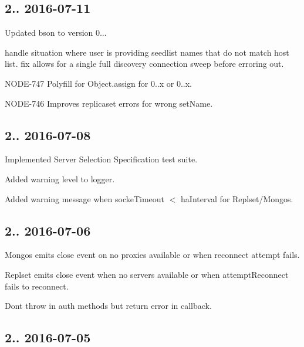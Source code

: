 \subsection*{2.. 2016-\/07-\/11 }


\begin{DoxyItemize}
\item Updated bson to version 0...
\item handle situation where user is providing seedlist names that do not match host list. fix allows for a single full discovery connection sweep before erroring out.
\item N\+O\+D\+E-\/747 Polyfill for Object.\+assign for 0..\+x or 0..\+x.
\item N\+O\+D\+E-\/746 Improves replicaset errors for wrong set\+Name.
\end{DoxyItemize}

\subsection*{2.. 2016-\/07-\/08 }


\begin{DoxyItemize}
\item Implemented Server Selection Specification test suite.
\item Added warning level to logger.
\item Added warning message when socke\+Timeout $<$ ha\+Interval for Replset/\+Mongos.
\end{DoxyItemize}

\subsection*{2.. 2016-\/07-\/06 }


\begin{DoxyItemize}
\item Mongos emits close event on no proxies available or when reconnect attempt fails.
\item Replset emits close event when no servers available or when attempt\+Reconnect fails to reconnect.
\item Don\textquotesingle{}t throw in auth methods but return error in callback.
\end{DoxyItemize}

\subsection*{2.. 2016-\/07-\/05 }



